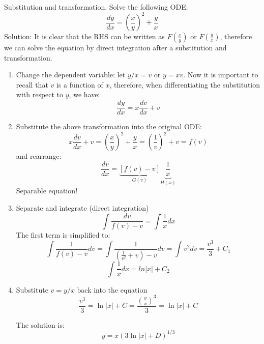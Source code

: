 \begin{exmp}{Substitution and transformation.}
Solve the following ODE:
\begin{equation}
\frac{dy}{dx}=\left(\frac{x}{y}\right)^2+\frac{y}{x}
\end{equation}
Solution: It is clear that the RHS can be written as $F\left(\frac{x}{y}\right)$ or $F\left(\frac{y}{x}\right)$, therefore we can solve the equation by direct integration after a substitution and transformation.
\begin{enumerate}
\item Change the dependent variable: let $y/x=v$ or $y=xv$. Now it is important to recall that $v$ is a function of $x$, therefore, when differentiating the substitution with respect to $y$, we have:
\begin{equation}
\boxed{\frac{dy}{dx}=x\frac{dv}{dx}+v}
\end{equation}
\item  Substitute the above transformation into the original ODE:
\begin{equation}
x\frac{dv}{dx}+v = \left(\frac{x}{y}\right)^2+\frac{y}{x} = \left(\frac{1}{v}\right)^2+v = f(v)
\end{equation}
 and rearrange:
\begin{equation}
\frac{dv}{dx} = \underbrace{\left[f(v)-v\right]}_{G(v)}\underbrace{\frac{1}{x}}_{H(x)}
\end{equation}
 Separable equation!
 
 \item Separate and integrate (direct integration)
\begin{equation}
\int \frac{dv}{f(v)-v} =\int \frac{1}{x} dx
\end{equation}
 The first term is simplified to:
\begin{equation}
 \int \frac{1}{f(v)-v}dv = \int \frac{1}{\left(\frac{1}{v^2}+v\right)-v}dv= \int v^2 dv=\frac{v^3}{3}+C_1
\end{equation}
\begin{equation}
\int \frac{1}{x} dx = ln\left|x\right|+C_2
\end{equation}

\item Substitute $v=y/x$ back into the equation
\begin{equation}
 \frac{v^3}{3}=\ln\left|x\right| +C = \frac{\left(\frac{y}{x}\right)^3}{3}=\ln\left|x\right|+C
\end{equation}

The solution is:
\begin{equation}
 y=x \left(3\ln\left|x\right|+D\right)^{1/3} 
\end{equation}
\end{enumerate}
\end{exmp}


